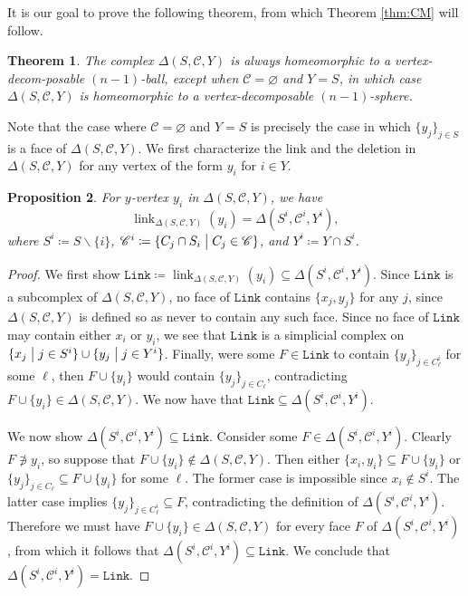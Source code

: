 \documentclass[10pt]{amsart}
\numberwithin{equation}{section}
\newtheorem{thm}{Theorem}[section]
\newtheorem{prop}[thm]{Proposition}
\theoremstyle{definition}
\theoremstyle{remark}
\newcommand{\st}{\bigm\vert}
\newcommand{\sC}{\mathscr{C}}
\renewcommand{\emptyset}{\varnothing}
\DeclareMathOperator{\link}{\mathrm{link}}
\newcommand{\Link}{\mathtt{Link}}
\newcommand{\1}{^{-1}}
\begin{document}
It is our goal to prove the following theorem, from which Theorem \ref{thm:CM} will follow.

\begin{thm}\label{homeo}
The complex $\Delta(S,\sC,Y)$ is always homeomorphic to a vertex-decom-posable $(n-1)$-ball, except when $\sC = \emptyset$ and $Y=S$, in which case $\Delta(S,\sC,Y)$ is homeomorphic to a vertex-decomposable $(n-1)$-sphere.
\end{thm}

Note that the case where $\sC = \emptyset$ and $Y=S$ is precisely the case in which $\{y_j\}_{j \in S}$ is a face of $\Delta(S,\sC,Y)$. We first characterize the link and the deletion in $\Delta(S,\sC,Y)$ for any vertex of the form $y_i$ for $i\in Y$.

\begin{prop}\label{link}
For $y$-vertex $y_i$ in $\Delta(S,\sC,Y)$, we have
\[
\link_{\Delta(S,\sC,Y)}(y_i) = \Delta(S^i,\sC^i,Y^i),
\]
where $S^i \coloneqq S \smallsetminus \{i\}$, $\sC^i \coloneqq \{C_j \cap S_i \st C_j \in \sC\}$, and $Y^i \coloneqq Y \cap S^i$.
\end{prop}
\begin{proof}
We first show $\Link \coloneqq \link_{\Delta(S,\sC,Y)}(y_i) \subseteq
\Delta(S^i,\sC^i,Y^i)$. Since $\Link$ is a subcomplex of
$\Delta(S,\sC,Y)$, no face of $\Link$ contains $\{x_j,y_j\}$ for any
$j$, since $\Delta(S,\sC,Y)$ is defined so as never to contain any
such face. Since no face of $\Link$ may contain either $x_i$ or $y_i$,
we see that $\Link$ is a simplicial complex on $\{x_j \st j \in S^i\}
\cup \{y_j \st j \in Y^i\}$. Finally, were some $F \in \Link$ to
contain  $\{y_j\}_{j \in C_\ell^i}$ for some $\ell$, then $F \cup
\{y_i\}$ would contain $\{y_j\}_{j \in C_\ell}$, contradicting $F \cup
\{y_i\} \in \Delta(S,\sC,Y)$. We now have that $\Link \subseteq
\Delta(S^i,\sC^i,Y^i)$.

 We now show $\Delta(S^i,\sC^i,Y^i) \subseteq \Link$. Consider some $F \in \Delta(S^i,\sC^i,Y^i)$. Clearly $F \not\ni y_i$, so suppose that $F \cup \{y_i\} \notin \Delta(S,\sC,Y)$. Then either $\{x_i,y_i\} \subseteq F \cup \{y_i\}$ or $\{y_j\}_{j \in C_\ell} \subseteq F \cup \{y_i\}$ for some $\ell$. The former case is impossible since $x_i \notin S^i$. The latter case implies $\{y_j\}_{j \in C_\ell^i} \subseteq F$, contradicting the definition of $\Delta(S^i,\sC^i,Y^i)$. Therefore we must have $F \cup \{y_i\} \in \Delta(S,\sC,Y)$ for every face $F$ of $\Delta(S^i,\sC^i,Y^i)$, from which it follows that $\Delta(S^i,\sC^i,Y^i) \subseteq \Link$. We conclude that $\Delta(S^i,\sC^i,Y^i) = \Link$.
\end{proof}
\end{document}
